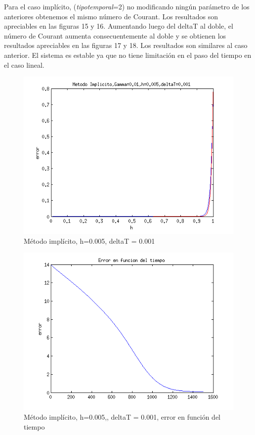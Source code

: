 \documentclass[11pt]{article}
\begin{document}
\bigskip Para el caso impl\'icito, (\textit{tipotemporal}=2) no modificando ning\'un par\'ametro de los anteriores obtenemos el mismo n\'umero de Courant. Los resultados son apreciables en las figuras 15 y 16. Aumentando luego del deltaT al doble, el n\'umero de Courant aumenta consecuentemente al doble y se obtienen los resultados apreciables en las figuras 17 y 18. Los resultados son similares al caso anterior. El sistema es estable ya que no tiene limitaci\'on en el paso del tiempo en el caso lineal.

\begin{figure}[tbh]
	\centering
		\includegraphics[width=1.0\textwidth]{imagen15.png}
	\caption{M\'etodo impl\'icito, h=0.005, deltaT = 0.001}
	\label{fig:Fig1}
\end{figure}

\begin{figure}[tbh]
	\centering
		\includegraphics[width=1.0\textwidth]{imagen16.png}
	\caption{M\'etodo impl\'icito, h=0.005,, deltaT = 0.001, error en funci\'on del tiempo}
	\label{fig:Fig1}
\end{figure}
\end{document}
